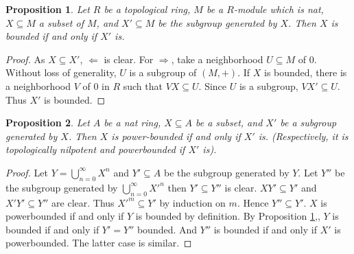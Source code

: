 \documentclass[8pt]{article}
\numberwithin{equation}{section}
\newtheorem{proposition}{Proposition}[subsection]
\newcommand{\sep}[0]{\:|\:}
\begin{document}
\begin{proposition}
    \label{fact_16_1}
    Let $R$ be a topological ring, $M$ be a $R$-module which is nat, $X\subseteq M$ a subset of $M$, and $X'\subseteq M$ be the subgroup generated by $X$. Then $X$ is bounded if and only if $X'$ is.
\end{proposition}
\begin{proof}
    As $X\subseteq X'$, $\Leftarrow$ is clear. %
    For $\Rightarrow$, take a neighborhood $U\subseteq M$ of $0$. Without loss of generality, $U$ is a subgroup of $(M,+)$. If $X$ is bounded, there is a neighborhood $V$ of $0$ in $R$ such that $VX\subseteq U$. Since $U$ is a subgroup, $VX'\subseteq U$. Thus $X'$ is bounded.
\end{proof}

\begin{proposition}
    \label{fact_16_1_b}
    Let $A$ be a nat ring, $X\subseteq A$ be a subset, and $X'$ be a subgroup generated by $X$. Then $X$ is power-bounded if and only if $X'$ is. (Respectively, it is topologically nilpotent and powerbounded if $X'$ is).
\end{proposition}

\begin{proof}
    Let $Y = \bigcup_{n=0}^\infty X^n$ and $Y'\subseteq A$ be the subgroup generated by $Y$. Let $Y''$ be the subgroup generated by $\bigcup_{n=0}^\infty {X'}^n$ then $Y'\subseteq Y''$ is clear. $XY'\subseteq Y'$ and $X'Y'
     \subseteq Y''$ are clear. %
    Thus ${X'}^m\subseteq Y'$ by induction on $m$. Hence $Y''\subseteq Y'$. $X$ is powerbounded if and only if $Y$ is bounded by definition. By Proposition \ref{fact_16_1},, $Y$ is bounded if and only if $Y'= Y''$ bounded. And $Y''$ is bounded if and only if $X'$ is powerbounded. The latter case is similar.
\end{proof}
\end{document}
